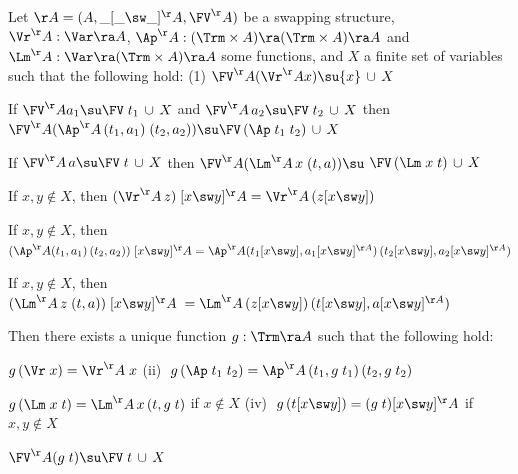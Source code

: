 \begin{thm} \rm \cite{primrecFOAS-Norrish04}
	\label{thm-norrishRec}
	Let $\AA = (A,\_[\_\sw\_]^\AA,\FV^\AA)$  be  a swapping structure, %
	$\Vr^\AA : \Var %
	\ra A$, 
	$\Ap^\AA : (\Trm \times A) \ra (\Trm \times A) \ra A$ 
	and 
   $\Lm^\AA : \Var \ra (\Trm \times A) \ra A$ 
	some functions, and $X$ a finite set of variables such that 
	the following hold: %
	\hspace*{5ex}
	(1) $\FV^\AA(\Vr^\AA x) \su \{x\} \,\cup\,X$
	\begin{mmmyitem}
		\item[(2)] 
		If $\FV^\AA a_1 \su \FV\;t_1 \,\cup\,X$ 
		and $\FV^\AA\,a_2 \su \FV\;t_2 \,\cup\,X$  
		then 
		\\$\FV^\AA(\Ap^\AA\,(t_1,a_1)\;(t_2,a_2)) \su 
		\FV\,(\Ap\;t_1\;t_2) \,\cup\,X$
		\item[(3)]  
		If $\FV^\AA\,a \su \FV\;t  \,\cup\,X$  
		then 
		$\FV^\AA(\Lm^\AA\,x\;(t,a)) \su$  
		$\FV\,(\Lm\;x\;t)  \,\cup\,X$
		\item[(4)]  If $x,y\notin X$, then $(\Vr^\AA\,z)\;[x\sw y]^\AA = 
		\Vr^\AA\,(z[x\sw y])$
		\item[(5)]  If $x,y\notin X$, then $(\Ap^\AA(t_1,a_1)\,(t_2,a_2))\;[x\sw y]^\AA = 
		\Ap^\AA(t_1[x\sw y],a_1[x\sw y]^{\AA})\, 
		(t_2[x\sw y],a_2[x\sw y]^{\AA})$
		\item[(6)]  If $x,y\notin X$, then $(\Lm^\AA\,z\;(t,a))\;[x\sw y]^\AA \;= \Lm^\AA\,(z[x\sw y])\, 
		(t[x\sw y],a[x\sw y]^{\AA})$
	\end{mmmyitem}
	Then there exists a unique function $g: \Trm \ra A$ such that the following hold:  
	\begin{myitem}
		\item[(i)]  $g\,(\Vr\;x) = \Vr^\AA\;x$
	\hspace*{23.9ex}
		(ii) $\;g\,(\Ap\;t_1\;t_2)= \Ap^\AA\,(t_1,g\;t_1)\,(t_2,g\;t_2)$
		\item[(iii)]  
		$g\,(\Lm\;x\;t) = \Lm^\AA\,x\,(t,g\;t)$ 
		if $x\notin X$
			\hspace*{5.5ex}
		(iv) 
		$\;g\,(t[x \sw y]) = (g\;t) [x \sw y]^\AA$ if $x,y\notin X$
		\item[(v)] $\FV^\AA(g\;t) \su \FV\;t \,\cup\, X$   %
	\end{myitem}
\end{thm}

